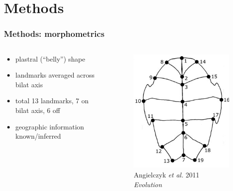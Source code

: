 \documentclass{beamer}\usepackage{graphicx, color}
\begin{document}
\section{Methods}
\begin{frame}
  \frametitle{Methods: morphometrics}
  \begin{columns}
    \begin{column}{0.5\textwidth}
      \begin{itemize}
        \item plastral (``belly'') shape
        \item landmarks averaged across bilat axis
        \item total 13 landmarks, 7 on bilat axis, 6 off
        \item geographic information known/inferred
      \end{itemize}
    \end{column}
    \begin{column}{0.5\textwidth}
      \begin{figure}[h]
        \centering
        \captionsetup{justification = raggedleft, slc = off}
        \includegraphics[width = \textwidth, keepaspectratio = true]{figure/plastra}
        \caption*{\scriptsize{Angielczyk \textit{et al.} 2011 \textit{Evolution}}}
        \label{fig:plast}
      \end{figure}
    \end{column}
  \end{columns}
\end{frame}
\end{document}
